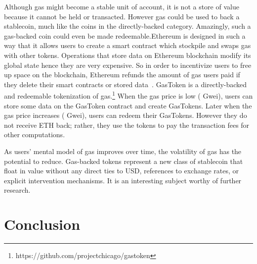 Although gas might become a stable unit of account, it is not a store of value because it cannot be held or transacted. However gas could be used to back a stablecoin, much like the coins in the directly-backed category. Amazingly, such a gas-backed coin could even be made redeemable.Ethereum is designed in such a way that it allows users to create a smart contract which stockpile and swaps gas with other tokens. Operations that store data on Ethereum blockchain modify its global state hence they are very expensive. So in order to incentivize users to free up space on the blockchain, Ethereum refunds the amount of gas users paid if they delete their smart contracts or stored data~\cite{wood2014ethereum}. GasToken is a directly-backed and redeemable tokenization of gas.\footnote{https://github.com/projectchicago/gastoken} When the gas price is low ( Gwei), users can store some data on the GasToken contract and create GasTokens. Later when the gas price increases ( Gwei), users can redeem their GasTokens. However they do not receive ETH back; rather, they use the tokens to pay the transaction fees for other computations. 

As users' mental model of gas improves over time, the volatility of gas has the potential to reduce. Gas-backed tokens represent a new class of stablecoin that float in value without any direct ties to USD, references to exchange rates, or explicit intervention mechanisms. It is an interesting subject worthy of further research. 








\section{Conclusion}

